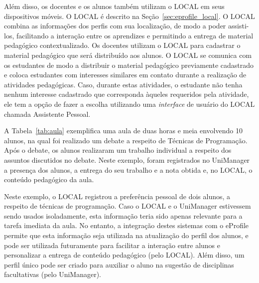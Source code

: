 Além disso, os docentes e os alunos também utilizam o LOCAL em seus dispositivos móveis. O LOCAL \cite{barbosa11} é descrito na Seção~\ref{sec:eprofile_local}. O LOCAL combina as informações dos perfis com sua localização, de modo a poder assisti-los, facilitando a interação entre os aprendizes e permitindo a entrega de material pedagógico contextualizado. Os docentes utilizam o LOCAL para cadastrar o material pedagógico que será distribuído aos alunos. O LOCAL se comunica com os estudantes de modo a distribuir o material pedagógico previamente cadastrado e coloca estudantes com interesses similares em contato durante a realização de atividades pedagógicas. Caso, durante estas atividades, o estudante não tenha nenhum interesse cadastrado que corresponda àqueles requeridos pela atividade, ele tem a opção de fazer a escolha utilizando uma {\it interface} de usuário do LOCAL chamada Assistente Pessoal. 

A Tabela~\ref{tab:aula} exemplifica uma aula de duas horas e meia envolvendo 10 alunos, na qual foi realizado um debate a respeito de Técnicas de Programação. Após o debate, os alunos realizaram um trabalho individual a respeito dos assuntos discutidos no debate. Neste exemplo, foram registrados no UniManager a presença dos alunos, a entrega do seu trabalho e a nota obtida e, no LOCAL, o conteúdo pedagógico da aula.

Neste exemplo, o LOCAL registrou a preferência pessoal de dois alunos, a respeito de técnicas de programação. Caso o LOCAL e o UniManager estivessem sendo usados isoladamente, esta informação teria sido apenas relevante para a tarefa imediata da aula. No entanto, a integração destes sistemas com o eProfile permite que esta informação seja utilizada na atualização do perfil dos alunos, e pode ser utilizada futuramente para facilitar a interação entre alunos e personalizar a entrega de conteúdo pedagógico (pelo LOCAL). Além disso, um perfil único pode ser criado para auxiliar o aluno na sugestão de disciplinas facultativas (pelo UniManager).

